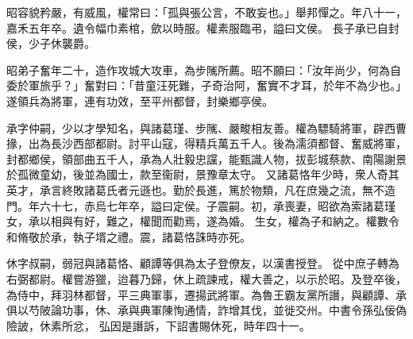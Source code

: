 \begin{pinyinscope}
 
昭容貌矜嚴，有威風，權常曰：「孤與張公言，不敢妄也。」舉邦憚之。年八十一，嘉禾五年卒。遺令幅巾素棺，歛以時服。權素服臨弔，謚曰文侯。
 長子承已自封侯，少子休襲爵。
 
 
 
 
 昭弟子奮年二十，造作攻城大攻車，為步隲所薦。昭不願曰：「汝年尚少，何為自委於軍旅乎？」奮對曰：「昔童汪死難，子奇治阿，奮實不才耳，於年不為少也。」遂領兵為將軍，連有功效，至平州都督，封樂鄉亭侯。
 
 
承字仲嗣，少以才學知名，與諸葛瑾、步隲、嚴畯相友善。權為驃騎將軍，辟西曹掾，出為長沙西部都尉。討平山寇，得精兵萬五千人。後為濡須都督、奮威將軍，封都鄉侯，領部曲五千人，承為人壯毅忠讜，能甄識人物，拔彭城蔡款、南陽謝景於孤微童幼，後並為國士，款至衞尉，景豫章太守。
 又諸葛恪年少時，衆人奇其英才，承言終敗諸葛氏者元遜也。勤於長進，篤於物類，凡在庶幾之流，無不造門。年六十七，赤烏七年卒，謚曰定侯。子震嗣。初，承喪妻，昭欲為索諸葛瑾女，承以相與有好，難之，權聞而勸焉，遂為婚。
 生女，權為子和納之。權數令和脩敬於承，執子壻之禮。震，諸葛恪誅時亦死。
 
 
休字叔嗣，弱冠與諸葛恪、顧譚等俱為太子登僚友，以漢書授登。
 從中庶子轉為右弼都尉。權嘗游獵，迨暮乃歸，休上疏諫戒，權大善之，以示於昭。及登卒後，為侍中，拜羽林都督，平三典軍事，遷揚武將軍。為魯王霸友黨所譖，與顧譚、承俱以芍陂論功事，休、承與典軍陳恂通情，詐增其伐，並徙交州。中書令孫弘佞偽險詖，休素所忿，
 弘因是譖訴，下詔書賜休死，時年四十一。
 
 
\end{pinyinscope}